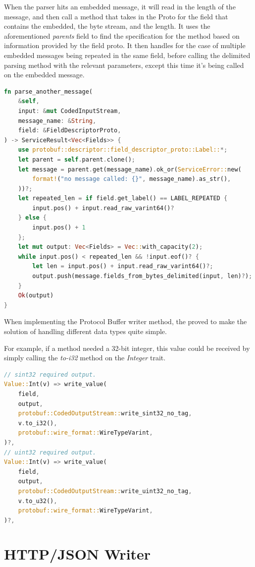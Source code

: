 \documentclass[a4paper,12pt]{report}
\begin{document}
When the parser hits an embedded message, it will read in the length of the message, and then call a method that takes in the Proto for the field that contains the embedded, the byte stream, and the length.
It uses the aforementioned \textit{parents} field to find the specification for the method based on information provided by the field proto.
It then handles for the case of multiple embedded messages being repeated in the same field, before calling the delimited parsing method with the relevant parameters, except this time it's being called on the embedded message.

\begin{lstlisting}[language=Rust]
fn parse_another_message(
    &self,
    input: &mut CodedInputStream,
    message_name: &String,
    field: &FieldDescriptorProto,
) -> ServiceResult<Vec<Fields>> {
    use protobuf::descriptor::field_descriptor_proto::Label::*;
    let parent = self.parent.clone();
    let message = parent.get(message_name).ok_or(ServiceError::new(
        format!("no message called: {}", message_name).as_str(),
    ))?;
    let repeated_len = if field.get_label() == LABEL_REPEATED {
        input.pos() + input.read_raw_varint64()?
    } else {
        input.pos() + 1
    };
    let mut output: Vec<Fields> = Vec::with_capacity(2);
    while input.pos() < repeated_len && !input.eof()? {
        let len = input.pos() + input.read_raw_varint64()?;
        output.push(message.fields_from_bytes_delimited(input, len)?);
    }
    Ok(output)
}
\end{lstlisting}

When implementing the Protocol Buffer writer method, the \textit{} proved to make the solution of handling different data types quite simple.

For example, if a method needed a 32-bit integer, this value could be received by simply calling the \textit{to-i32} method on the \textit{Integer} trait.

\begin{lstlisting}[language=Rust]
// sint32 required output.
Value::Int(v) => write_value(
    field,
    output,
    protobuf::CodedOutputStream::write_sint32_no_tag,
    v.to_i32(),
    protobuf::wire_format::WireTypeVarint,
)?,
// uint32 required output.
Value::Int(v) => write_value(
    field,
    output,
    protobuf::CodedOutputStream::write_uint32_no_tag,
    v.to_u32(),
    protobuf::wire_format::WireTypeVarint,
)?,
\end{lstlisting}

\section{HTTP/JSON Writer}
\label{im:http}
\end{document}
